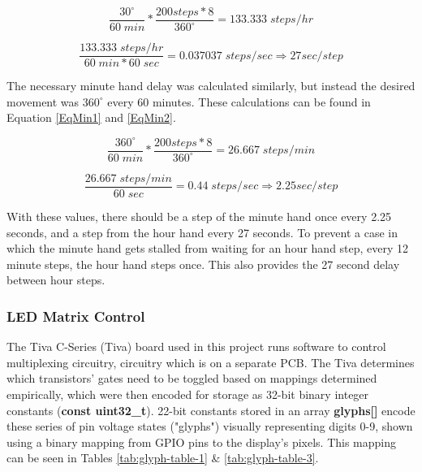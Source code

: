 \documentclass[11pt]{article}
\begin{document}
\begin{equation}
\frac{30^\circ}{60\;min}*\frac{200 steps * 8}{360^\circ} = 133.333\;steps/hr
\label{EqHr1}
\end{equation}

\begin{equation}
\frac{133.333\;steps/hr}{60\;min * 60\;sec} = 0.037037\;steps/sec\Rightarrow 27 sec/step
\label{EqHr2}
\end{equation}

The necessary minute hand delay was calculated similarly, but instead the desired movement was  $360^\circ$ every 60 minutes. These calculations can be found in Equation \ref{EqMin1} and \ref{EqMin2}.

\begin{equation}
\frac{360^\circ}{60\;min}*\frac{200 steps * 8}{360^\circ} = 26.667\;steps/min
\label{EqMin1}
\end{equation}

\begin{equation}
\frac{26.667\;steps/min}{60\;sec} = 0.44\;steps/sec\Rightarrow 2.25 sec/step
\label{EqMin2}
\end{equation}

With these values, there should be a step of the minute hand once every 2.25 seconds, and a step from the hour hand every 27 seconds. To prevent a case in which the minute hand gets stalled from waiting for an hour hand step, every 12 minute steps, the hour hand steps once. This also provides the 27 second delay between hour steps. 


\subsubsection{LED Matrix Control}
\label{DigitalDesign}



The Tiva C-Series (Tiva) board used in this project runs software to control multiplexing circuitry, circuitry which is on a separate PCB. 
The Tiva determines which transistors' gates need to be toggled based on mappings determined empirically, which were then encoded for storage as 32-bit binary integer constants (\textbf{const uint32\_t}). 
22-bit constants stored in an array \textbf{glyphs[]} encode these series of pin voltage states ("glyphs") visually representing digits 0-9, shown using a binary mapping from GPIO pins to the display's pixels. 
This mapping can be seen in Tables \ref{tab:glyph-table-1} \& \ref{tab:glyph-table-3}. 
\end{document}
